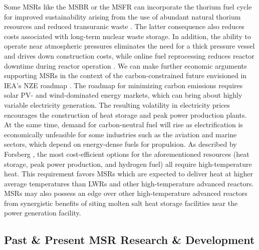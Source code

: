 Some \glspl{MSR} like the \gls{MSBR} or the \gls{MSFR} can
incorporate the thorium fuel cycle for improved sustainability arising from the
use of abundant natural thorium resources and reduced transuranic waste
\cite{heuer_towards_2014}. The latter consequence also reduces costs
associated with long-term nuclear waste storage. In addition, the ability to
operate near atmospheric pressures eliminates the need for a thick pressure
vessel and drives down construction costs, while online fuel reprocessing
reduces reactor downtime during reactor operation \cite{dolan_1_2017}.
We can make further economic arguments supporting \glspl{MSR} in the context of the
carbon-constrained future envisioned in \gls{IEA}'s \gls{NZE} roadmap
\cite{iea_net_2021}. The roadmap for minimizing carbon emissions requires solar \gls{PV}- and
wind-dominated energy markets, which can bring about highly variable electricity generation. The
resulting volatility in electricity prices
encourages the construction of heat storage and peak power
production plants. At the same time, demand for carbon-neutral
fuel will rise as electrification is economically unfeasible
for some industries such as the aviation and marine sectors, which depend on
energy-dense fuels for propulsion. As described by Forsberg
\cite{forsberg_market_2020}, the most cost-efficient options for the
aforementioned resources (heat storage, peak power
production, and hydrogen fuel) all require high-temperature heat.
This requirement favors \glspl{MSR} which are expected to deliver heat at higher average
temperatures than \glspl{LWR} and other high-temperature advanced reactors.
\glspl{MSR} may also possess an edge over other high-temperature advanced reactors from
synergistic benefits of siting molten salt heat storage facilities near the power generation
facility.

\subsection{Past \& Present \gls{MSR} Research \& Development}

